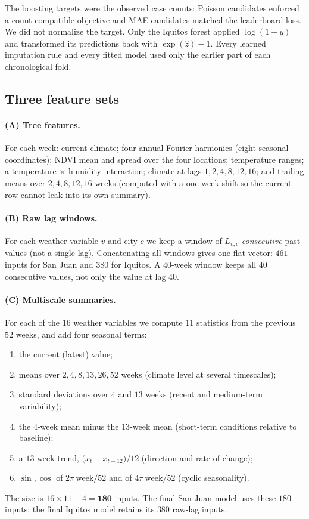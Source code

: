\documentclass[11pt,a4paper]{article}
\begin{document}
The boosting targets were the observed case counts: Poisson candidates enforced a count-compatible objective and MAE candidates matched the leaderboard loss. We did not normalize the target. Only the Iquitos forest applied $\log(1+y)$ and transformed its predictions back with $\exp(\hat z)-1$. Every learned imputation rule and every fitted model used only the earlier part of each chronological fold.

\subsection{Three feature sets}
\paragraph{(A) Tree features.} For each week: current climate; four annual Fourier harmonics (eight seasonal coordinates); NDVI mean and spread over the four locations; temperature ranges; a temperature $\times$ humidity interaction; climate at lags $1,2,4,8,12,16$; and trailing means over $2,4,8,12,16$ weeks (computed with a one-week shift so the current row cannot leak into its own summary).

\paragraph{(B) Raw lag windows.} For each weather variable $v$ and city $c$ we keep a window of $L_{v,c}$ \emph{consecutive} past values (not a single lag). Concatenating all windows gives one flat vector: $461$ inputs for San Juan and $380$ for Iquitos. A $40$-week window keeps all $40$ consecutive values, not only the value at lag $40$.

\paragraph{(C) Multiscale summaries.} For each of the $16$ weather variables we compute $11$ statistics from the previous $52$ weeks, and add four seasonal terms:
\begin{enumerate}[label=\arabic*.]
  \item the current (latest) value;
  \item means over $2,4,8,13,26,52$ weeks (climate level at several timescales);
  \item standard deviations over $4$ and $13$ weeks (recent and medium-term variability);
  \item the $4$-week mean minus the $13$-week mean (short-term conditions relative to baseline);
  \item a $13$-week trend, $\bigl(x_t-x_{t-12}\bigr)/12$ (direction and rate of change);
  \item $\sin,\cos$ of $2\pi\,\mathrm{week}/52$ and of $4\pi\,\mathrm{week}/52$ (cyclic seasonality).
\end{enumerate}
The size is $16\times 11+4=\mathbf{180}$ inputs. The final San Juan model uses these $180$ inputs; the final Iquitos model retains its $380$ raw-lag inputs.
\end{document}

